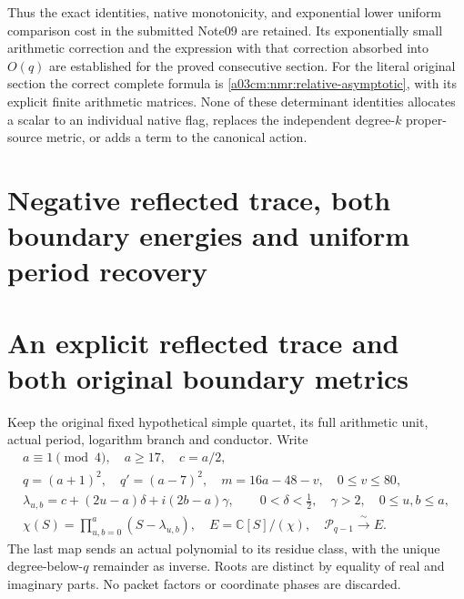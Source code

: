 \documentclass[11pt,a4paper]{article}
\begin{document}
Thus the exact identities, native monotonicity, and exponential lower
uniform comparison cost in the submitted Note09 are retained.
Its exponentially small arithmetic correction and the expression
with that correction absorbed into $O(q)$ are established for the
proved consecutive section. For the literal original section the
correct complete formula is \eqref{a03cm:nmr:relative-asymptotic}, with
its explicit finite arithmetic matrices. None of these determinant identities allocates
a scalar to an individual native flag, replaces the independent
degree-$k$ proper-source metric, or adds a term to the canonical action.



\endgroup

\clearpage
\begingroup


\setcounter{equation}{0}
\renewcommand{\theequation}{A03RP.\arabic{equation}}
\section*{Negative reflected trace, both boundary energies and uniform period recovery}
\begingroup
\section{An explicit reflected trace and both original boundary metrics}
\label{a03rp:sec:RBV}

Keep the original fixed hypothetical simple quartet, its full arithmetic
unit, actual period, logarithm branch and conductor. Write
\[
\begin{gathered}
a\equiv1\pmod4,\quad a\ge17,\quad c=a/2,\\
q=(a+1)^2,\quad q'=(a-7)^2,\quad m=16a-48-v,\quad0\le v\le80,\\
\lambda_{u,b}=c+(2u-a)\delta+i(2b-a)\gamma,\qquad
0<\delta<\tfrac12,\quad\gamma>2,\quad0\le u,b\le a,\\
\chi(S)=\prod_{u,b=0}^a(S-\lambda_{u,b}),\quad
E=\mathbb C[S]/(\chi),\quad
\mathcal P_{q-1}\xrightarrow{\ \sim\ }E .
\end{gathered}\tag{RBV1}
\]
The last map sends an actual polynomial to its residue class, with
the unique degree-below-$q$ remainder as inverse. Roots are distinct
by equality of real and imaginary parts. No packet factors or coordinate
phases are discarded.
\end{document}
